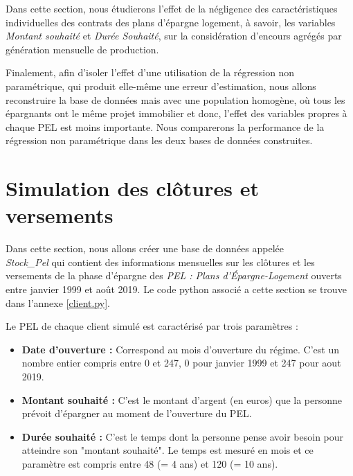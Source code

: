 \documentclass[12pt, a4paper]{book}
\begin{document}
Dans cette section, nous étudierons l'effet de la négligence des caractéristiques individuelles des contrats des plans d'épargne logement, à savoir, les variables {\it Montant souhaité} et {\it Durée Souhaité}, sur la considération d'encours agrégés par génération mensuelle de production.  

Finalement, afin d'isoler l'effet d'une utilisation de la régression non paramétrique, qui produit elle-même une erreur d'estimation, nous allons reconstruire la base de données mais avec une population homogène, où tous les épargnants ont le même projet immobilier et donc, l'effet des variables propres à chaque PEL est moins importante. Nous comparerons la performance de la régression non paramétrique dans les deux bases de données construites. 

\section{Simulation des clôtures et versements}

Dans cette section, nous allons créer une base de données appelée \\{\it Stock\_Pel} qui contient des informations mensuelles sur les clôtures et les versements de la phase d'épargne des {\it PEL : Plans d'Épargne-Logement} ouverts entre janvier 1999 et août 2019. Le code python associé a cette section se trouve dans l'annexe \ref{client.py}.

Le PEL de chaque client simulé est caractérisé par trois paramètres :

\bigskip

\begin{itemize}
\item {\bf Date d'ouverture :} Correspond au mois d'ouverture du régime. C'est un nombre entier compris entre 0 et 247, 0 pour janvier 1999 et 247 pour aout 2019.

\medskip

\item {\bf Montant souhaité :} C'est le montant d'argent (en euros) que la personne prévoit d'épargner au moment de l'ouverture du PEL.

\medskip

\item {\bf Durée souhaité :} C'est le temps dont la personne pense avoir besoin pour atteindre son "montant souhaité". Le temps est mesuré en mois et ce paramètre est compris entre 48 (= 4 ans) et 120 (= 10 ans).
\end{itemize}
\end{document}
